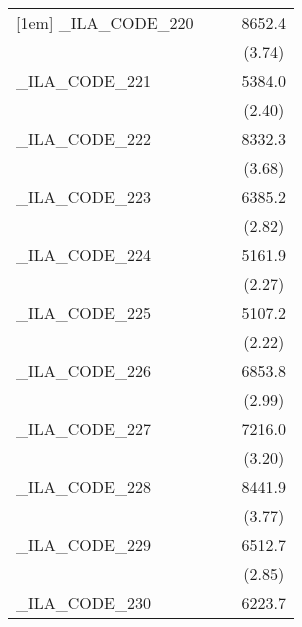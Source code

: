 {\begin{tabular}{l*{3}{c}}
[1em]
\_ILA\_CODE\_220&                     &                     &      8652.4\sym{***}\\
            &                     &                     &      (3.74)         \\
[1em]
\_ILA\_CODE\_221&                     &                     &      5384.0\sym{*}  \\
            &                     &                     &      (2.40)         \\
[1em]
\_ILA\_CODE\_222&                     &                     &      8332.3\sym{***}\\
            &                     &                     &      (3.68)         \\
[1em]
\_ILA\_CODE\_223&                     &                     &      6385.2\sym{**} \\
            &                     &                     &      (2.82)         \\
[1em]
\_ILA\_CODE\_224&                     &                     &      5161.9\sym{*}  \\
            &                     &                     &      (2.27)         \\
[1em]
\_ILA\_CODE\_225&                     &                     &      5107.2\sym{*}  \\
            &                     &                     &      (2.22)         \\
[1em]
\_ILA\_CODE\_226&                     &                     &      6853.8\sym{**} \\
            &                     &                     &      (2.99)         \\
[1em]
\_ILA\_CODE\_227&                     &                     &      7216.0\sym{**} \\
            &                     &                     &      (3.20)         \\
[1em]
\_ILA\_CODE\_228&                     &                     &      8441.9\sym{***}\\
            &                     &                     &      (3.77)         \\
[1em]
\_ILA\_CODE\_229&                     &                     &      6512.7\sym{**} \\
            &                     &                     &      (2.85)         \\
[1em]
\_ILA\_CODE\_230&                     &                     &      6223.7\sym{**} \\

\end{tabular}}
